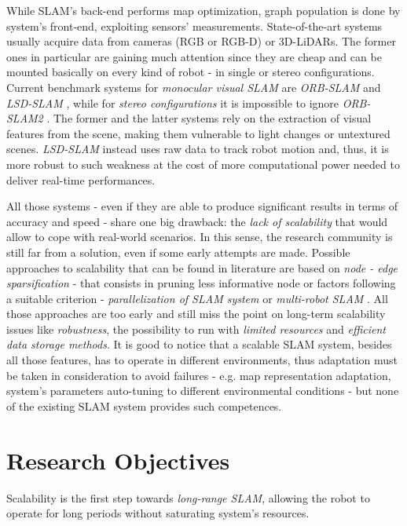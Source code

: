 \documentclass[10pt,a4paper, notitlepage]{report}
\begin{document}
While SLAM's back-end performs map optimization, graph population is done by system's front-end, exploiting sensors' measurements. State-of-the-art systems usually acquire data from cameras (RGB or RGB-D) or 3D-LiDARs. The former ones in particular are gaining much attention since they are cheap and can be mounted basically on every kind of robot - in single or stereo configurations. Current benchmark systems for \textit{monocular visual SLAM} are \textit{ORB-SLAM} \cite{mur2015orb-slam} and \textit{LSD-SLAM} \cite{engel2014lsd-slam}, while for \textit{stereo configurations} it is impossible to ignore \textit{ORB-SLAM2} \cite{mur2017orb-slam2}. The former and the latter systems rely on the extraction of visual features from the scene, making them vulnerable to light changes or untextured scenes. \textit{LSD-SLAM} instead uses raw data to track robot motion and, thus, it is more robust to such weakness at the cost of more computational power needed to deliver real-time performances.

All those systems - even if they are able to produce significant results in terms of accuracy and speed - share one big drawback: the \textit{lack of scalability} that would allow to cope with real-world scenarios. In this sense, the research community is still far from a solution, even if some early attempts are made. Possible approaches to scalability that can be found in literature are based on \textit{node - edge sparsification} \cite{kretzschmar2011graph-pruninig} \cite{huang2013consistent} - that consists in pruning less informative node or factors following a suitable criterion - \textit{parallelization of SLAM system} \cite{ni-dallaert2010nested-dissections} \cite{ni-dallaert2007tectonicSAM} \cite{grisetti2010hogman} or \textit{multi-robot SLAM} \cite{cunningham2013ddfSAM2} \cite{lazaro2013mr-slam}. All those approaches are too early and still miss the point on long-term scalability issues like \textit{robustness}, the possibility to run with \textit{limited resources} and \textit{efficient data storage methods}. It is good to notice that a scalable SLAM system, besides all those features, has to operate in different environments, thus adaptation must be taken in consideration to avoid failures - e.g. map representation adaptation, system's parameters auto-tuning to different environmental conditions - but none of the existing SLAM system provides such competences.

\section*{Research Objectives}
Scalability is the first step towards \textit{long-range SLAM}, allowing the robot to operate for long periods without saturating system's resources. 
\end{document}
